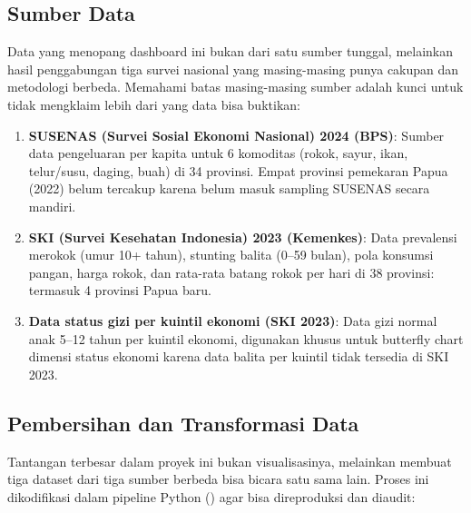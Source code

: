 \subsection{Sumber Data}

Data yang menopang dashboard ini bukan dari satu sumber tunggal, melainkan hasil penggabungan tiga survei nasional yang masing-masing punya cakupan dan metodologi berbeda. Memahami batas masing-masing sumber adalah kunci untuk tidak mengklaim lebih dari yang data bisa buktikan:

\begin{enumerate}
  \item \textbf{SUSENAS (Survei Sosial Ekonomi Nasional) 2024 (BPS)}: Sumber data pengeluaran per kapita untuk 6 komoditas (rokok, sayur, ikan, telur/susu, daging, buah) di 34 provinsi. Empat provinsi pemekaran Papua (2022) belum tercakup karena belum masuk sampling SUSENAS secara mandiri.
  \item \textbf{SKI (Survei Kesehatan Indonesia) 2023 (Kemenkes)}: Data prevalensi merokok (umur 10+ tahun), stunting balita (0--59 bulan), pola konsumsi pangan, harga rokok, dan rata-rata batang rokok per hari di 38 provinsi: termasuk 4 provinsi Papua baru.
  \item \textbf{Data status gizi per kuintil ekonomi (SKI 2023)}: Data gizi normal anak 5--12 tahun per kuintil ekonomi, digunakan khusus untuk butterfly chart dimensi status ekonomi karena data balita per kuintil tidak tersedia di SKI 2023.
\end{enumerate}

\subsection{Pembersihan dan Transformasi Data}

Tantangan terbesar dalam proyek ini bukan visualisasinya, melainkan membuat tiga dataset dari tiga sumber berbeda bisa bicara satu sama lain. Proses ini dikodifikasi dalam pipeline Python () agar bisa direproduksi dan diaudit:

